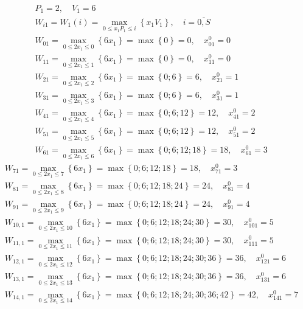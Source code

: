 \begin{align*}
     & P_1 = 2, \quad V_1 = 6                                                                                                    \\
     & W_{i1} = W_1(i) = \max\limits_{0 \leq x_1P_1 \leq i} \left\{x_1V_1\right\}, \quad i = \overline{0, S}                     \\
     & W_{01} = \max\limits_{0 \leq 2x_1 \leq 0} \left\{6x_1\right\} = \max \left\{0\right\} = 0, \quad x_{01}^0 = 0             \\
     & W_{11} = \max\limits_{0 \leq 2x_1 \leq 1} \left\{6x_1\right\} = \max \left\{0\right\} = 0, \quad x_{11}^0 = 0             \\
     & W_{21} = \max\limits_{0 \leq 2x_1 \leq 2} \left\{6x_1\right\} = \max \left\{0; 6\right\} = 6, \quad x_{21}^0 = 1          \\
     & W_{31} = \max\limits_{0 \leq 2x_1 \leq 3} \left\{6x_1\right\} = \max \left\{0; 6\right\} = 6, \quad x_{31}^0 = 1          \\
     & W_{41} = \max\limits_{0 \leq 2x_1 \leq 4} \left\{6x_1\right\} = \max \left\{0; 6; 12\right\} = 12, \quad x_{41}^0 = 2     \\
     & W_{51} = \max\limits_{0 \leq 2x_1 \leq 5} \left\{6x_1\right\} = \max \left\{0; 6; 12\right\} = 12, \quad x_{51}^0 = 2     \\
     & W_{61} = \max\limits_{0 \leq 2x_1 \leq 6} \left\{6x_1\right\} = \max \left\{0; 6; 12; 18\right\} = 18, \quad x_{61}^0 = 3
\end{align*}
\begin{align*}
     & W_{71} = \max\limits_{0 \leq 2x_1 \leq 7} \left\{6x_1\right\} = \max \left\{0; 6; 12; 18\right\} = 18, \quad x_{71}^0 = 3                      \\
     & W_{81} = \max\limits_{0 \leq 2x_1 \leq 8} \left\{6x_1\right\} = \max \left\{0; 6; 12; 18; 24\right\} = 24, \quad x_{81}^0 = 4                  \\
     & W_{91} = \max\limits_{0 \leq 2x_1 \leq 9} \left\{6x_1\right\} = \max \left\{0; 6; 12; 18; 24\right\} = 24, \quad x_{91}^0 = 4                  \\
     & W_{10, 1} = \max\limits_{0 \leq 2x_1 \leq 10} \left\{6x_1\right\} = \max \left\{0; 6; 12; 18; 24; 30\right\} = 30, \quad x_{101}^0 = 5         \\
     & W_{11, 1} = \max\limits_{0 \leq 2x_1 \leq 11} \left\{6x_1\right\} = \max \left\{0; 6; 12; 18; 24; 30\right\} = 30, \quad x_{111}^0 = 5         \\
     & W_{12, 1} = \max\limits_{0 \leq 2x_1 \leq 12} \left\{6x_1\right\} = \max \left\{0; 6; 12; 18; 24; 30; 36\right\} = 36, \quad x_{121}^0 = 6     \\
     & W_{13, 1} = \max\limits_{0 \leq 2x_1 \leq 13} \left\{6x_1\right\} = \max \left\{0; 6; 12; 18; 24; 30; 36\right\} = 36, \quad x_{131}^0 = 6     \\
     & W_{14, 1} = \max\limits_{0 \leq 2x_1 \leq 14} \left\{6x_1\right\} = \max \left\{0; 6; 12; 18; 24; 30; 36; 42\right\} = 42, \quad x_{141}^0 = 7
\end{align*}

